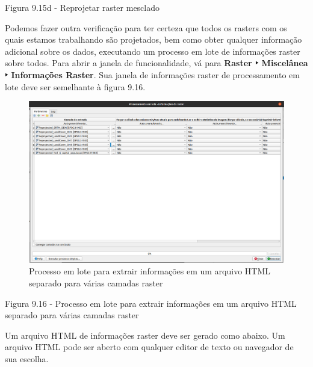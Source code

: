 \documentclass[
]{book}
\begin{document}
Figura 9.15d - Reprojetar raster mesclado

Podemos fazer outra verificação para ter certeza que todos os rasters com os quais estamos trabalhando são projetados, bem como obter qualquer informação adicional sobre os dados, executando um processo em lote de informações raster sobre todos. Para abrir a janela de funcionalidade, vá para \textbf{Raster ‣ Miscelânea ‣ Informações Raster}. Sua janela de informações raster de processamento em lote deve ser semelhante à figura 9.16.

\begin{figure}
\centering
\includegraphics{media/modulo9/fig916.png}
\caption{Processo em lote para extrair informações em um arquivo HTML separado para várias camadas raster}
\end{figure}

Figura 9.16 - Processo em lote para extrair informações em um arquivo HTML separado para várias camadas raster

Um arquivo HTML de informações raster deve ser gerado como abaixo. Um arquivo HTML pode ser aberto com qualquer editor de texto ou navegador de sua escolha.
\end{document}
